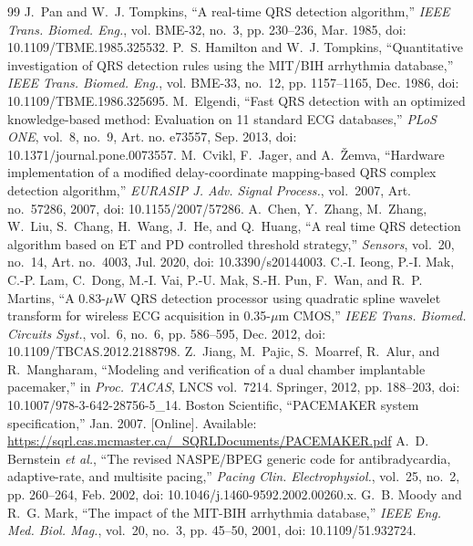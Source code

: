 \documentclass[11pt,a4paper]{article}
\begin{document}
\begin{thebibliography}{99}\small
{} J.~Pan and W.~J. Tompkins, ``A real-time {QRS} detection algorithm,'' \emph{IEEE Trans. Biomed. Eng.}, vol. BME-32, no.~3, pp. 230--236, Mar. 1985, doi: 10.1109/TBME.1985.325532.
 P.~S. Hamilton and W.~J. Tompkins, ``Quantitative investigation of {QRS} detection rules using the {MIT/BIH} arrhythmia database,'' \emph{IEEE Trans. Biomed. Eng.}, vol. BME-33, no.~12, pp. 1157--1165, Dec. 1986, doi: 10.1109/TBME.1986.325695.
 M.~Elgendi, ``Fast {QRS} detection with an optimized knowledge-based method: Evaluation on 11 standard {ECG} databases,'' \emph{PLoS ONE}, vol.~8, no.~9, Art. no. e73557, Sep. 2013, doi: 10.1371/journal.pone.0073557.
 M.~Cvikl, F.~Jager, and A.~\v{Z}emva, ``Hardware implementation of a modified delay-coordinate mapping-based {QRS} complex detection algorithm,'' \emph{EURASIP J. Adv. Signal Process.}, vol.~2007, Art. no.~57286, 2007, doi: 10.1155/2007/57286.
 A.~Chen, Y.~Zhang, M.~Zhang, W.~Liu, S.~Chang, H.~Wang, J.~He, and Q.~Huang, ``A real time {QRS} detection algorithm based on {ET} and {PD} controlled threshold strategy,'' \emph{Sensors}, vol.~20, no.~14, Art. no.~4003, Jul. 2020, doi: 10.3390/s20144003.
 C.-I. Ieong, P.-I. Mak, C.-P. Lam, C.~Dong, M.-I. Vai, P.-U. Mak, S.-H. Pun, F.~Wan, and R.~P. Martins, ``A 0.83-$\mu$W {QRS} detection processor using quadratic spline wavelet transform for wireless {ECG} acquisition in 0.35-$\mu$m {CMOS},'' \emph{IEEE Trans. Biomed. Circuits Syst.}, vol.~6, no.~6, pp. 586--595, Dec. 2012, doi: 10.1109/TBCAS.2012.2188798.
 Z.~Jiang, M.~Pajic, S.~Moarref, R.~Alur, and R.~Mangharam, ``Modeling and verification of a dual chamber implantable pacemaker,'' in \emph{Proc. TACAS}, LNCS vol.~7214. Springer, 2012, pp. 188--203, doi: 10.1007/978-3-642-28756-5\_14.
 Boston Scientific, ``{PACEMAKER} system specification,'' Jan. 2007. [Online]. Available: \url{https://sqrl.cas.mcmaster.ca/_SQRLDocuments/PACEMAKER.pdf}
 A.~D. Bernstein \emph{et al.}, ``The revised {NASPE/BPEG} generic code for antibradycardia, adaptive-rate, and multisite pacing,'' \emph{Pacing Clin. Electrophysiol.}, vol.~25, no.~2, pp. 260--264, Feb. 2002, doi: 10.1046/j.1460-9592.2002.00260.x.
 G.~B. Moody and R.~G. Mark, ``The impact of the {MIT-BIH} arrhythmia database,'' \emph{IEEE Eng. Med. Biol. Mag.}, vol.~20, no.~3, pp. 45--50, 2001, doi: 10.1109/51.932724.

\end{thebibliography}
\end{document}
